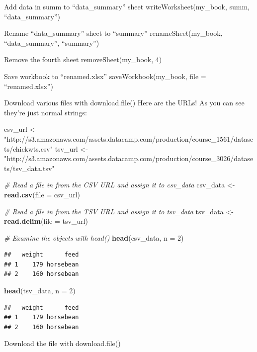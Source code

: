 \documentclass[]{book}
\newenvironment{Shaded}{\begin{snugshade}}{\end{snugshade}}
\newcommand{\CommentTok}[1]{\textcolor[rgb]{0.56,0.35,0.01}{\textit{#1}}}
\newcommand{\DataTypeTok}[1]{\textcolor[rgb]{0.13,0.29,0.53}{#1}}
\newcommand{\DecValTok}[1]{\textcolor[rgb]{0.00,0.00,0.81}{#1}}
\newcommand{\KeywordTok}[1]{\textcolor[rgb]{0.13,0.29,0.53}{\textbf{#1}}}
\newcommand{\NormalTok}[1]{#1}
\newcommand{\StringTok}[1]{\textcolor[rgb]{0.31,0.60,0.02}{#1}}
\begin{document}
Add data in summ to ``data\_summary'' sheet
writeWorksheet(my\_book, summ, ``data\_summary'')

Rename ``data\_summary'' sheet to ``summary''
renameSheet(my\_book, ``data\_summary'', ``summary'')

Remove the fourth sheet
removeSheet(my\_book, 4)

Save workbook to ``renamed.xlsx''
saveWorkbook(my\_book, file = ``renamed.xlsx'')

Download various files with download.file()
Here are the URLs! As you can see they're just normal strings:

\begin{Shaded}
\begin{Highlighting}[]
\NormalTok{csv_url <-}\StringTok{ "http://s3.amazonaws.com/assets.datacamp.com/production/course_1561/datasets/chickwts.csv"}
\NormalTok{tsv_url <-}\StringTok{ "http://s3.amazonaws.com/assets.datacamp.com/production/course_3026/datasets/tsv_data.tsv"}

\CommentTok{# Read a file in from the CSV URL and assign it to csv_data}
\NormalTok{csv_data <-}\StringTok{ }\KeywordTok{read.csv}\NormalTok{(}\DataTypeTok{file =}\NormalTok{ csv_url)}

\CommentTok{# Read a file in from the TSV URL and assign it to tsv_data}
\NormalTok{tsv_data <-}\StringTok{ }\KeywordTok{read.delim}\NormalTok{(}\DataTypeTok{file =}\NormalTok{ tsv_url)}

\CommentTok{# Examine the objects with head()}
\KeywordTok{head}\NormalTok{(csv_data, }\DataTypeTok{n =} \DecValTok{2}\NormalTok{)}
\end{Highlighting}
\end{Shaded}

\begin{verbatim}
##   weight      feed
## 1    179 horsebean
## 2    160 horsebean
\end{verbatim}

\begin{Shaded}
\begin{Highlighting}[]
\KeywordTok{head}\NormalTok{(tsv_data, }\DataTypeTok{n =} \DecValTok{2}\NormalTok{)}
\end{Highlighting}
\end{Shaded}

\begin{verbatim}
##   weight      feed
## 1    179 horsebean
## 2    160 horsebean
\end{verbatim}

Download the file with download.file()
\end{document}
